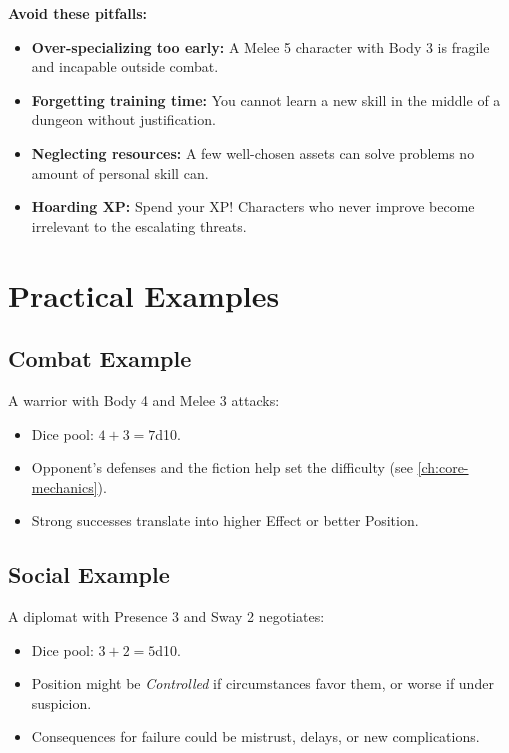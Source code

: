 \begin{tcolorbox}[colback=orange!5!white, colframe=orange!75!black, title=Common Advancement Mistakes,breakable]
\noindent\textbf{Avoid these pitfalls:}
\begin{itemize}
  \item \textbf{Over-specializing too early:} A Melee 5 character with Body 3 is fragile and incapable outside combat.
  \item \textbf{Forgetting training time:} You cannot learn a new skill in the middle of a dungeon without justification.
  \item \textbf{Neglecting resources:} A few well-chosen assets can solve problems no amount of personal skill can.
  \item \textbf{Hoarding XP:} Spend your XP! Characters who never improve become irrelevant to the escalating threats.
\end{itemize}
\end{tcolorbox}

\section{Practical Examples}
\label{sec:practical-examples}

\subsection{Combat Example}
\label{sec:combat-example}
A warrior with Body 4 and Melee 3 attacks:
\begin{itemize}
  \item Dice pool: $4 + 3 = 7$d10.
  \item Opponent's defenses and the fiction help set the difficulty (see \ref{ch:core-mechanics}).
  \item Strong successes translate into higher Effect or better Position.
\end{itemize}

\subsection{Social Example}
\label{sec:social-example}
A diplomat with Presence 3 and Sway 2 negotiates:
\begin{itemize}
  \item Dice pool: $3 + 2 = 5$d10.
  \item Position might be \emph{Controlled} if circumstances favor them, or worse if under suspicion.
  \item Consequences for failure could be mistrust, delays, or new complications.
\end{itemize}

